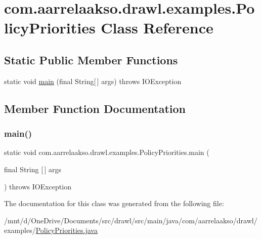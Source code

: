 \hypertarget{classcom_1_1aarrelaakso_1_1drawl_1_1examples_1_1_policy_priorities}{}\section{com.\+aarrelaakso.\+drawl.\+examples.\+Policy\+Priorities Class Reference}
\label{classcom_1_1aarrelaakso_1_1drawl_1_1examples_1_1_policy_priorities}
\subsection*{Static Public Member Functions}
\begin{DoxyCompactItemize}
\item 
static void \hyperlink{classcom_1_1aarrelaakso_1_1drawl_1_1examples_1_1_policy_priorities_a8e93196f3da008884909a2dabec04d3f}{main} (final String\mbox{[}$\,$\mbox{]} args)  throws I\+O\+Exception     
\end{DoxyCompactItemize}


\subsection{Member Function Documentation}
\mbox{\label{classcom_1_1aarrelaakso_1_1drawl_1_1examples_1_1_policy_priorities_a8e93196f3da008884909a2dabec04d3f}} 
\subsubsection{\texorpdfstring{main()}{main()}}
{\footnotesize\ttfamily static void com.\+aarrelaakso.\+drawl.\+examples.\+Policy\+Priorities.\+main (\begin{DoxyParamCaption}\item[{final String \mbox{[}$\,$\mbox{]}}]{args }\end{DoxyParamCaption}) throws I\+O\+Exception\hspace{0.3cm}{\ttfamily [static]}}



The documentation for this class was generated from the following file\+:\begin{DoxyCompactItemize}
\item 
/mnt/d/\+One\+Drive/\+Documents/src/drawl/src/main/java/com/aarrelaakso/drawl/examples/\hyperlink{_policy_priorities_8java}{Policy\+Priorities.\+java}\end{DoxyCompactItemize}
